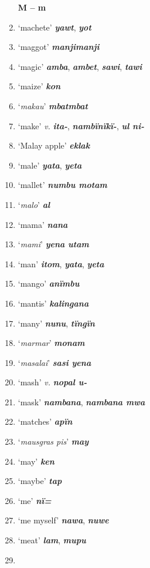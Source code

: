 \begin{enumerate}[noitemsep, label={}, align=left, widest=190, labelsep=1ex,leftmargin=*,itemindent=-10pt]
\noindent \textbf{M – m}\\ \item

‘machete’ \textbf{\textit{yawt}}, \textbf{\textit{yot}} \item
‘maggot’ \textbf{\textit{manjimanji}} \item
‘magic’ \textbf{\textit{amba}}, \textbf{\textit{ambet}}, \textbf{\textit{sawi}}, \textbf{\textit{tawi}} \item
‘maize’ \textbf{\textit{kon}} \item
‘\textit{makau}’ \textbf{\textit{mbatmbat}} \item
‘make’ \textit{v.} \textbf{\textit{ita-}}, \textbf{\textit{nambïnïkï-}}, \textbf{\textit{ul ni-}} \item
‘Malay apple’ \textbf{\textit{eklak}} \item
‘male’ \textbf{\textit{yata}}, \textbf{\textit{yeta}} \item
‘mallet’ \textbf{\textit{numbu motam}} \item
‘\textit{malo}’ \textbf{\textit{al}} \item
‘mama’ \textbf{\textit{nana}} \item
‘\textit{mami}’ \textbf{\textit{yena utam}} \item
‘man’ \textbf{\textit{itom}}, \textbf{\textit{yata}}, \textbf{\textit{yeta}} \item
‘mango’ \textbf{\textit{anïmbu}} \item
‘mantis’ \textbf{\textit{kalingana}} \item
‘many’ \textbf{\textit{nunu}}, \textbf{\textit{tïngïn}} \item
‘\textit{marmar}’ \textbf{\textit{monam}} \item
‘\textit{masalai}’ \textbf{\textit{sasi yena}} \item
‘mash’ \textit{v.} \textbf{\textit{nopal u-}} \item
‘mask’ \textbf{\textit{nambana}}, \textbf{\textit{nambana mwa}} \item
‘matches’ \textbf{\textit{apïn}} \item
‘\textit{mausgras pis}’ \textbf{\textit{may}} \item
‘may’ \textbf{\textit{ken}} \item
‘maybe’ \textbf{\textit{tap}} \item
‘me’ \textbf{\textit{nï=}} \item
‘me myself’ \textbf{\textit{nawa}}, \textbf{\textit{nuwe}} \item
‘meat’ \textbf{\textit{lam}}, \textbf{\textit{mupu}} \item

\end{enumerate}
